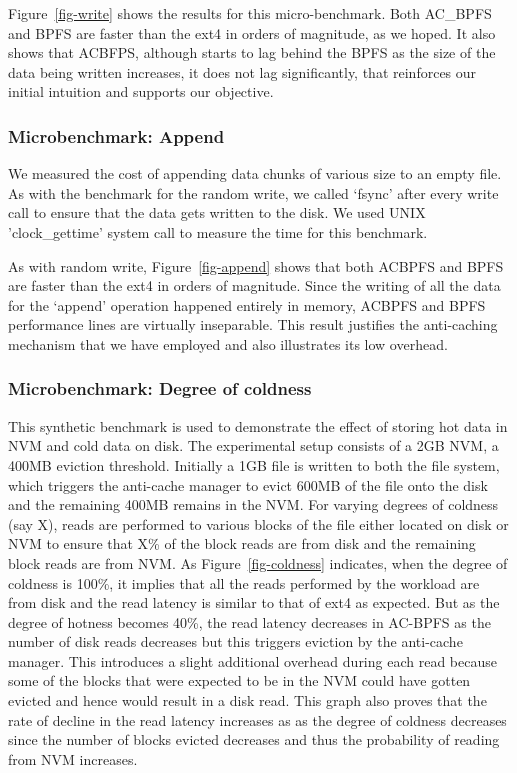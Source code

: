 Figure~\ref{fig-write} shows the results for this micro-benchmark. Both AC\_BPFS and BPFS are faster than the ext4 in orders of magnitude, as we hoped. It also shows that AC\-BFPS, although starts to lag behind the BPFS as the size of the data being written increases, it does not lag significantly, that reinforces our initial intuition and supports our objective.



\subsubsection{Microbenchmark: Append}
We measured the cost of appending data chunks of various size to an empty file. As with the benchmark for the random write, we called ‘fsync’ after every write call to ensure that the data gets written to the disk. We used UNIX 'clock\_gettime' system call to measure the time for this benchmark.

As with random write, Figure~\ref{fig-append}  shows that both AC\-BPFS and BPFS are faster than the ext4 in orders of magnitude. Since the writing of all the data for the ‘append’ operation happened entirely in memory, AC\-BPFS and BPFS performance lines are virtually inseparable. This result justifies the anti-caching mechanism that we have employed and also illustrates its low overhead.


\subsubsection{Microbenchmark: Degree of coldness}
This synthetic benchmark is used to demonstrate the effect of storing hot data in NVM and cold data on disk. The experimental setup consists of a 2GB NVM, a 400MB eviction threshold. Initially a 1GB file is written to both the file system, which triggers the anti-cache manager to evict 600MB of the file onto the disk and the remaining 400MB remains in the NVM. For varying degrees of coldness (say X), reads are performed to various blocks of the file either located on disk or NVM to ensure that X\% of the block reads are from disk and the remaining block reads are from NVM. As Figure~\ref{fig-coldness} indicates, when the degree of coldness is 100\%, it implies that all the reads performed by the workload are from disk and the read latency is similar to that of ext4 as expected. But as the degree of hotness becomes 40\%, the read latency decreases in AC-BPFS as the number of disk reads decreases but this triggers eviction by the anti-cache manager. This introduces a slight additional overhead during each read because some of the blocks that were expected to be in the NVM could have gotten evicted and hence would result in a disk read. This graph also proves that the rate of decline in the read latency increases as as the degree of coldness decreases since the number of blocks evicted decreases and thus the probability of reading from NVM increases.


